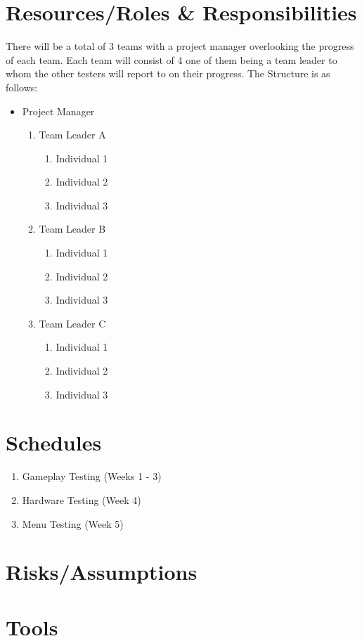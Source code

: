 \documentclass[a4paper, 10pt]{article}
\begin{document}
\section{Resources/Roles \& Responsibilities}
There will be a total of 3 teams with a project manager overlooking the progress of each team. Each team will consist of 4 one of them being a team leader to whom the other testers will report to on their progress. The Structure is as follows:
    \begin{itemize}
        \item Project Manager
            \begin{enumerate}
                \item Team Leader A
                    \begin{enumerate}
                        \item Individual 1
                        \item Individual 2
                        \item Individual 3
                    \end{enumerate}
                \item Team Leader B
                    \begin{enumerate}
                        \item Individual 1
                        \item Individual 2
                        \item Individual 3
                    \end{enumerate}
                \item Team Leader C
                    \begin{enumerate}
                        \item Individual 1
                        \item Individual 2
                        \item Individual 3
                    \end{enumerate}
            \end{enumerate}
    \end{itemize}

\section{Schedules}
\begin{enumerate}
    \item Gameplay Testing (Weeks 1 - 3)
    \item Hardware Testing (Week 4)
    \item Menu Testing (Week 5)
\end{enumerate}

\section{Risks/Assumptions}

\section{Tools}
\end{document}
